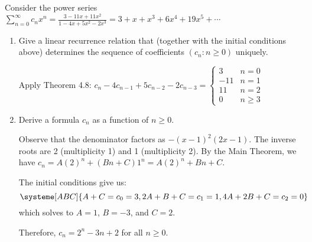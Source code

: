 \begin{xca}
  Consider the power series $\sum_{n=0}^\infty c_nx^n = \frac{3-11x+11x^2}{1-4x+5x^2-2x^3} = 3 + x + x^3 + 6x^4 + 19x^5 + \dotsb$
\end{xca}
\begin{enumerate}
  \item Give a linear recurrence relation that
        (together with the initial conditions above)
        determines the sequence of coefficients $(c_n : n \geq 0)$ uniquely.
        \begin{sol}
          Apply Theorem 4.8: $c_n - 4c_{n-1} + 5c_{n-2} - 2c_{n-3} = \begin{cases}
              3   & n=0      \\
              -11 & n=1      \\
              11  & n=2      \\
              0   & n \geq 3
            \end{cases}$
        \end{sol}
  \item Derive a formula $c_n$ as a function of $n \geq 0$.
        \begin{sol}
          Observe that the denominator factors as $-(x-1)^2(2x-1)$.
          The inverse roots are 2 (multiplicity 1) and 1 (multiplicity 2).
          By the Main Theorem, we have $c_n = A(2)^n + (Bn+C)1^n = A(2)^n + Bn + C$.

          The initial conditions give us:
          \[ \systeme[ABC]{A + C = {c_0=3}, 2A + B + C = {c_1=1}, 4A + 2B + C = {c_2=0}} \]
          which solves to $A = 1$, $B = -3$, and $C = 2$.

          Therefore, $c_n = 2^n - 3n + 2$ for all $n \geq 0$.
        \end{sol}
\end{enumerate}

